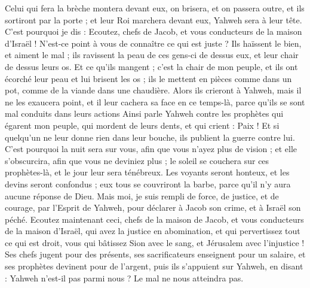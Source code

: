 \begin{multicols}{2}
Celui qui fera la brèche montera devant eux, on brisera, et on passera outre, et ils sortiront par la porte ; et leur Roi marchera devant eux, Yahweh sera à leur tête.
\VerseOne{}C'est pourquoi je dis : Ecoutez, chefs de Jacob, et vous conducteurs de la maison d'Israël ! N'est-ce point à vous de connaître ce qui est juste ?
Ils haïssent le bien, et aiment le mal ; ils ravissent la peau de ces gens-ci de dessus eux, et leur chair de dessus leurs os.
 Et ce qu'ils mangent ; c'est la chair de mon peuple, et ils ont écorché leur peau et lui brisent les os ; ils le mettent en pièces comme dans un pot, comme de la viande dans une chaudière.
Alors ils crieront à Yahweh, mais il ne les exaucera point, et il leur cachera sa face en ce temps-là, parce qu'ils se sont mal conduits dans leurs actions
Ainsi parle Yahweh contre les prophètes qui égarent mon peuple, qui mordent de leurs dents, et qui crient : Paix ! Et si quelqu'un ne leur donne rien dans leur bouche, ils publient la guerre contre lui.
C'est pourquoi la nuit sera sur vous, afin que vous n'ayez plus de vision ; et elle s'obscurcira, afin que vous ne deviniez plus ; le soleil se couchera sur ces prophètes-là, et le jour leur sera ténébreux.
Les voyants seront honteux, et les devins seront confondus ; eux tous se couvriront la barbe, parce qu'il n'y aura aucune réponse de Dieu.
Mais moi, je suis rempli de force, de justice, et de courage, par l'Esprit de Yahweh, pour déclarer à Jacob son crime, et à Israël son péché.
Ecoutez maintenant ceci, chefs de la maison de Jacob, et vous conducteurs de la maison d'Israël, qui avez la justice en abomination, et qui pervertissez tout ce qui est droit,
vous qui bâtissez Sion avec le sang, et Jérusalem avec l'injustice !
Ses chefs jugent pour des présents, ses sacrificateurs enseignent pour un salaire, et ses prophètes devinent pour de l'argent, puis ils s'appuient sur Yahweh, en disant : Yahweh n'est-il pas parmi nous ? Le mal ne nous atteindra pas.

\end{multicols}
